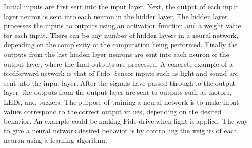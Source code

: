 Initial inputs are first sent into the input layer. Next, the output of each input layer neuron is sent into each neuron in the hidden layer. The hidden layer processes the inputs to outputs using an activation function and a weight value for each input. There can be any number of hidden layers in a neural network, depending on the complexity of the computation being performed. Finally the outputs from the last hidden layer neurons are sent into each neuron of the output layer, where the final outputs are processed. A concrete example of a feedforward network is that of Fido. Sensor inputs such as light and sound are sent into the input layer. After the signals have passed through to the output layer, the outputs from the output layer are sent to outputs such as motors, LEDs, and buzzers.  The purpose of training a neural network is to make input values correspond to the correct output values, depending on the desired behavior. An example could be making Fido drive when light is applied. The way to give a neural network desired behavior is by controlling the weights of each neuron using a learning algorithm.